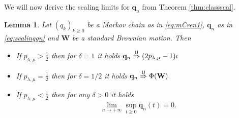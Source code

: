 \documentclass[]{amsart}
\numberwithin{equation}{section}
\newtheorem{lem}[thm]{Lemma}
\theoremstyle{remark}
\theoremstyle{definition}
\begin{document}
We will now derive the scaling limits for $\mathbf{q}_n$ from Theorem \ref{thm:classscal}.
\begin{lem}\label{lem:scalingMC2}
	Let $(q_k)_{k \ge 0}$ be a Markov chain as in \eqref{eq:mCren1}, $\mathbf{q}_n$ as in \eqref{eq:scalingqn} and $\mathbf{W}$ be a standard Brownian motion. Then
	\begin{itemize}
		\item[(i)] If $p_{\lambda,\mu}>\frac{1}{2}$ then for $\delta=1$ it holds $\displaystyle \mathbf{q}_n \overset{\sf U}{\Rightarrow}(2p_{\lambda,\mu}-1)\iota$
		\item[(ii)] If $p_{\lambda,\mu}=\frac{1}{2}$ then for $\delta=1/2$ it holds $\displaystyle \mathbf{q}_n \overset{\sf U}{\Rightarrow}\Phi(\mathbf{W})$
		\item[(iii)] If $p_{\lambda,\mu}<\frac{1}{2}$ then for any $\delta>0$ it holds 
		\begin{equation*}
		\lim_{n \to +\infty}\sup_{t \ge 0}\mathbf{q}_n(t)=0.
		\end{equation*}
	\end{itemize}
\end{lem}
\end{document}

